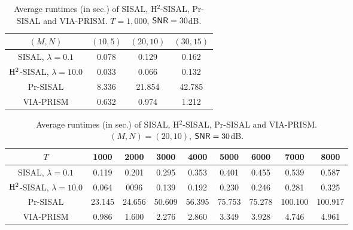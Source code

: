\documentclass[10pt,twocolumn,twoside]{IEEEtran}
\begin{document}
\begin{table}[!hbt]
	\centering
	\caption{Average runtimes (in sec.) of SISAL, H$^2$-SISAL, Pr-SISAL and VIA-PRISM. $T=1,000$, ${\sf SNR}= 30$dB.}
	\small
	\renewcommand{\arraystretch}{1.2}
	\begin{tabular}{c||c|c|c}
		\hline\hline
		$(M,N)$	&$(10, 5)$ & $(20,10)$ & $(30,15)$  \\
		\hline \hline
		SISAL, ${\lambda = 0.1} $  			  & 0.078 & 0.129 & 0.162    \\
		\hline
		${\rm H}^2$-SISAL, ${\lambda =10.0} $ & 0.033 & 0.066 & 0.132    \\
		\hline
		Pr-SISAL  & 8.336 & 21.854 & 42.785    \\
		\hline
		VIA-PRISM & 0.632 & 0.974 & 1.212 \\
		\hline \hline
	\end{tabular}
	\label{Tab:runtimeforSISAL+H2SISAL}
\end{table}



\begin{table}[!hbt]
	\centering
	\caption{Average runtimes (in sec.) of SISAL, H$^2$-SISAL, Pr-SISAL and VIA-PRISM. $(M,N)= (20,10)$, ${\sf SNR}= 30$dB.}
	\small
	\renewcommand{\arraystretch}{1.2}
	\begin{tabular}{c||c|c|c|c|c|c|c|c}
		\hline\hline
		$T$  &  1000  &  2000  &  3000  &  4000  &  5000  &  6000  &  7000  &  8000   \\
		\hline \hline
		SISAL, ${\lambda = 0.1} $  		& 0.119  & 0.201  & 0.295  & 0.353 & 0.401 & 0.455 & 0.539 & 0.587  \\
		\hline
		${\rm H}^2$-SISAL, ${\lambda =10.0} $ & 0.064  &  0096  &  0.139 & 0.192 & 0.230 & 0.246 & 0.281 & 0.325  \\
		\hline
		Pr-SISAL 	& 23.145  & 24.656  & 50.609 & 56.395 & 75.753 & 75.278&100.100&100.917  \\
		\hline
		VIA-PRISM  & 0.986 & 1.600 & 2.276 & 2.860 & 3.349 & 3.928 & 4.746 & 4.961 \\
		\hline \hline
	\end{tabular}
	\label{Tab:runtimeUnderdifferentT}
\end{table}
\end{document}
